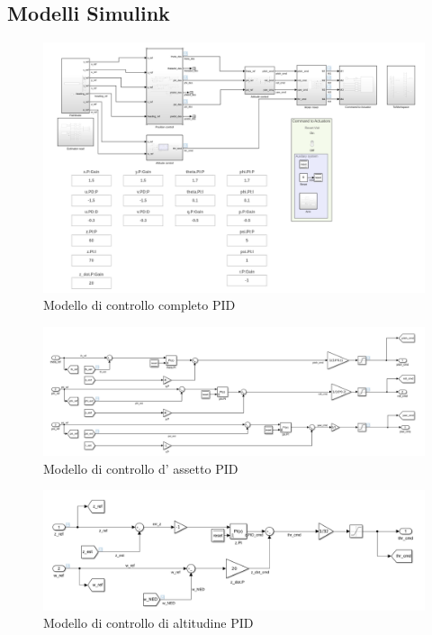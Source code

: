 \subsection{Modelli Simulink}
\begin{figure}
	\centering
	\includegraphics[width=1\textwidth]{DescrizioneAutopilota/Figure/completopid}
	\caption{Modello di controllo completo PID}
\end{figure}

\begin{figure}
	\centering
	\includegraphics[width=1\textwidth]{DescrizioneAutopilota/Figure/attitudecontrollerpid}
	\caption{Modello di controllo d' assetto PID}
\end{figure}

\begin{figure}
	\centering
	\includegraphics[width=1\textwidth]{DescrizioneAutopilota/Figure/altitudecontrollerpid}
	\caption{Modello di controllo di altitudine PID}
\end{figure}

